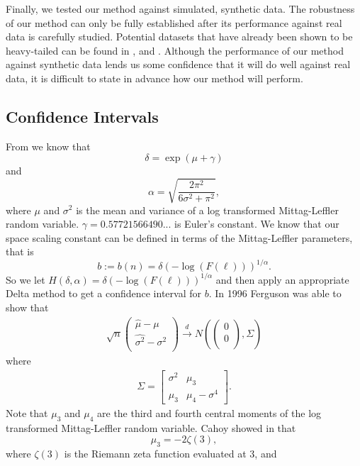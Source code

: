 \documentclass[honours,12pt]{unswthesis}
\newcommand{\1}{\mathbf 1}
\newcommand{\cd}{\overset{d}{\longrightarrow}}
\numberwithin{equation}{section}
\theoremstyle{definition}
\theoremstyle{remark}
\begin{document}
Finally, we tested our method against simulated, synthetic data. The robustness of our method can only be fully established after its performance against real data is carefully studied. Potential datasets that have already been shown to be heavy-tailed can be found in \cite{Karsai2012}, \cite{Resnick1995} and \cite{Mainardi2000}. Although the performance of our method against synthetic data lends us some confidence that it will do well against real data, it is difficult to state in advance how our method will perform.

\begin{appendices}
\chapter{Confidence Intervals}
From \cite{Cahoy2013} we know that
\[
\delta=\exp(\mu +\gamma)
\]
and
\[
\alpha=\sqrt{\frac{2\pi^2}{6\sigma^2+\pi^2}},
\]
where $\mu$ and $\sigma^2$ is the mean and variance of a log transformed Mittag-Leffler random variable. $\gamma=0.57721566490...$ is Euler's constant. We know that our space scaling constant can be defined in terms of the Mittag-Leffler parameters, that is
\[ 
b:=b(n)=\delta(-\log(F(\ell)))^{1/\alpha}.
\]
So we let $H(\delta,\alpha)=\delta(-\log(F(\ell)))^{1/\alpha}$ and then apply an appropriate Delta method to get a confidence interval for $b$. In 1996 Ferguson was able to show that \cite{Ferguson1996}
\begin{align*}
	\sqrt{n}\begin{pmatrix}
				\hat{\mu}-\mu\\
				\hat{\sigma^2}-\sigma^2\\				
			\end{pmatrix}
			\cd
			N\left(\begin{pmatrix}0\\0\\ \end{pmatrix},\Sigma	\right)
\end{align*}
where
\begin{align*}
	\Sigma=\begin{bmatrix}
		\sigma^2	& \mu_3\\
		\mu_3		& \mu_4-\sigma^4
	\end{bmatrix}.
\end{align*}
Note that $\mu_3$ and $\mu_4$ are the third and fourth central moments of the log transformed Mittag-Leffler random variable. Cahoy showed in \cite{Cahoy2013} that
\[
\mu_3=-2\zeta(3),
\]
where $\zeta(3)$ is the Riemann zeta function evaluated at 3, and

\end{appendices}
\end{document}
